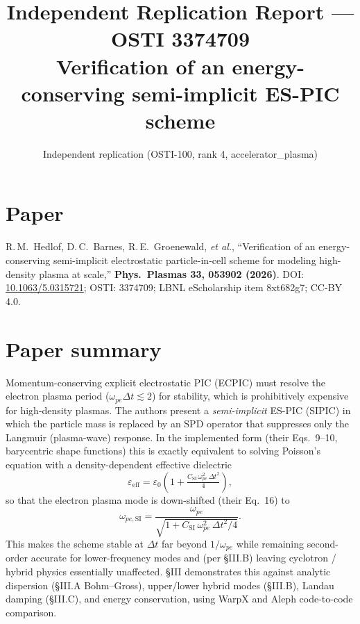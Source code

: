 \documentclass[11pt]{article}
\title{Independent Replication Report --- OSTI 3374709\\
\large Verification of an energy-conserving semi-implicit ES-PIC scheme}
\author{Independent replication (OSTI-100, rank 4, accelerator\_plasma)}
\date{}
\begin{document}
\maketitle

\section*{Paper}
R.\,M.~Hedlof, D.\,C.~Barnes, R.\,E.~Groenewald, \emph{et al.},
``Verification of an energy-conserving semi-implicit electrostatic
particle-in-cell scheme for modeling high-density plasma at scale,''
\textbf{Phys.\ Plasmas 33, 053902 (2026)}.
DOI: \href{https://doi.org/10.1063/5.0315721}{10.1063/5.0315721};
OSTI: 3374709; LBNL eScholarship item 8xt682g7; CC-BY 4.0.

\section{Paper summary}
Momentum-conserving explicit electrostatic PIC (ECPIC) must resolve the
electron plasma period ($\omega_{pe}\Delta t \lesssim 2$) for stability,
which is prohibitively expensive for high-density plasmas. The authors
present a \emph{semi-implicit} ES-PIC (SIPIC) in which the particle mass
is replaced by an SPD operator that suppresses only the Langmuir
(plasma-wave) response. In the implemented form (their Eqs.~9--10,
barycentric shape functions) this is exactly equivalent to solving
Poisson's equation with a density-dependent effective dielectric
\[
\varepsilon_{\text{eff}} = \varepsilon_0\!\left(1 + \tfrac{C_{\text{SI}}\,\omega_{pe}^{2}\,\Delta t^{2}}{4}\right),
\]
so that the electron plasma mode is down-shifted (their Eq.~16) to
\[
\omega_{pe,\text{SI}} = \frac{\omega_{pe}}{\sqrt{1 + C_{\text{SI}}\,\omega_{pe}^{2}\,\Delta t^{2}/4}}.
\]
This makes the scheme stable at $\Delta t$ far beyond $1/\omega_{pe}$ while
remaining second-order accurate for lower-frequency modes and (per
\S III.B) leaving cyclotron / hybrid physics essentially unaffected.
\S III demonstrates this against analytic dispersion (\S III.A
Bohm--Gross), upper/lower hybrid modes (\S III.B), Landau damping
(\S III.C), and energy conservation, using WarpX and Aleph code-to-code
comparison.
\end{document}
